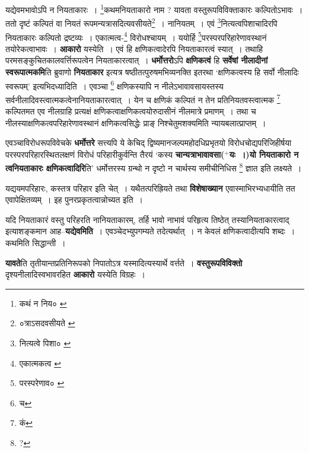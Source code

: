 \documentclass[article,12pt,a4paper]{memoir}
\newcommand{\add}[1]{($^{+}$#1)}
\begin{document}
	यद्येवमभावोऽपि न नियताकारः । \footnote{कथं न निय० \cite{dp-msA} \cite{dp-msB} \cite{dp-edP} \cite{dp-edH} \cite{dp-edN}}कथमनियताकारो नाम ? यावता वस्तुरूपविविक्ताकारः कल्पितोऽभावः । ततो दृष्टं कल्पितं वा नियतं रूपमन्यत्रासदित्यवसीयते\footnote{०त्राऽसदवसीयते \cite{dp-msA} \cite{dp-msB} \cite{dp-msD} \cite{dp-edP} \cite{dp-edH} \cite{dp-edE} \cite{dp-edN}} । नानियतम् । एवं \footnote{नित्यत्वे पिशा० \cite{dp-msA} \cite{dp-edP} \cite{dp-edH}}नित्यत्वपिशाचादिरपि नियताकारः कल्पितो द्रष्टव्यः । एकात्मत्व-\footnote{एकात्मकत्व \cite{dp-msA} \cite{dp-msB} \cite{dp-msC} \cite{dp-msD} \cite{dp-edP} \cite{dp-edH} \cite{dp-edE} \cite{dp-edN}} विरोधश्चायम् । ययोर्हि \footnote{परस्परेणाव० \cite{dp-msB}}परस्परपरिहारेणावस्थानं तयोरेकत्वाभावः । \textbf{आकारो} यस्येति । एवं हि क्षणिकत्वादेरपि नियताकारत्वं स्यात् । तथाहि परमसङ्कुचितकालवर्त्तिरूपत्वेन नियताकारत्वात् । \textbf{धर्मोत्तरो}ऽपि \textbf{क्षणिकत्वं} हि \textbf{सर्वेषां नीलादीनां स्वरूपात्मकमि}ति ब्रुवाणो \textbf{नियताकार} इत्यत्र षष्ठीतत्पुरुषमभिव्यनक्ति इतरथा ‘क्षणिकत्वस्य हि सर्वो नीलादिः स्वरूपम्’ इत्यभिदध्यादिति । एवञ्चा \footnote{च} क्षणिकस्यापि न नीलेऽभावावसायस्तस्य सर्वनीलादिवस्त्वात्मकत्वेनानियताकारत्वात् । येन च क्षणिकं कल्पितं न तेन प्रतिनियतवस्त्वात्मक \footnote{कं} कल्पितमत एव नीलग्राहि प्रत्यक्षं क्षणिकत्वाक्षणिकत्वयोरुदासीनं नीलमात्रे प्रमाणम् । तथा च नीलस्याक्षणिकत्वपरिहारेणावस्थानं क्षणिकत्वसिद्धेः प्राङ् निश्चेतुमशक्यमिति न्यायबलात्प्राप्तम् ।
	\pend
      

	  \pstart एवञ्चाविरोधरूपविवेचके \textbf{धर्मोत्तरे} सत्त्यपि ये केचिद् द्विष्यमानजल्पमहोदधिप्रभृतयो विरोधचोद्यपरिजिहीर्षया परस्परपरिहारस्थितलक्षणं विरोधं परिहारीकुर्वन्ति तैरयं ‘कस्य \textbf{चान्यत्राभावावसा\add{यः ।}यो नियताकारो न त्वनियताकारः क्षणिकत्वादिरि}ति’ धर्मोत्तरस्य ग्रन्थो न दृष्टो न चार्थस्य समीचीनिधिस \footnote{?} ज्ञात इति लक्ष्यते ।
	\pend
      

	  \pstart यद्ययमपरिहारः, कस्तत्र परिहार इति चेत् । यथैतत्परिह्रियते तथा \textbf{विशेषाख्यान} एवास्माभिरभ्यधायीति तत एवापेक्षितव्यम् । इह पुनरप्रकृतत्वान्नोच्यत इति ।
	\pend
      

	  \pstart यदि नियताकारं वस्तु परिहरति नानियताकारम्, तर्हि भावो नाभावं परिहृत्य तिष्ठेत् तस्यानियताकारत्वाद् इत्याशङ्कमान आह--\textbf{यद्येवमिति} । एवञ्चेदभ्युपगम्यते तदेत्यर्थात् । न केवलं क्षणिकत्वादीत्यपि शब्दः । कथमिति सिद्धान्ती ।
	\pend
      

	  \pstart \textbf{यावते}ति तृतीयान्तप्रतिनिरूपको निपातोऽत्र यस्मादित्यस्यार्थे वर्त्तते । \textbf{वस्तुरूपविविक्तो} दृश्यनीलादिस्वभावरहित \textbf{आकारो} यस्येति विग्रहः ।
	\pend
      
\end{document}
